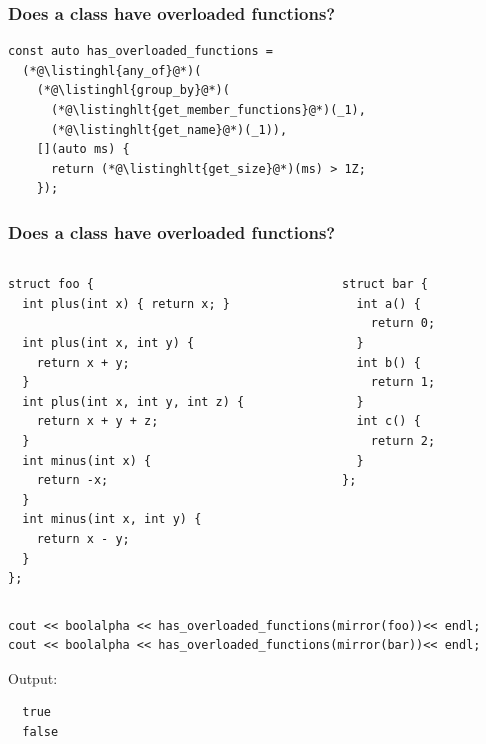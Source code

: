 \documentclass[aspectratio=169,compress,table,xcolor=table]{beamer}
\begin{document}
\begin{frame}[fragile]
  \frametitle{Does a class have overloaded functions?}
  \begin{lstlisting}[language=c++2x,basicstyle=\normalsize\ttfamily]
const auto has_overloaded_functions =
  (*@\listinghl{any_of}@*)(
    (*@\listinghl{group_by}@*)(
      (*@\listinghlt{get_member_functions}@*)(_1),
      (*@\listinghlt{get_name}@*)(_1)),
    [](auto ms) {
      return (*@\listinghlt{get_size}@*)(ms) > 1Z;
    });
  \end{lstlisting}
\end{frame}
\begin{frame}[fragile]
  \frametitle{Does a class have overloaded functions?}
  \begin{columns}
    \begin{column}{.50\textwidth}
      \begin{lstlisting}[language=c++2x,basicstyle=\tiny\ttfamily]
struct foo {
  int plus(int x) { return x; }

  int plus(int x, int y) {
    return x + y;
  }
  int plus(int x, int y, int z) {
    return x + y + z;
  }
  int minus(int x) {
    return -x;
  }
  int minus(int x, int y) {
    return x - y;
  }
};
      \end{lstlisting}
    \end{column}
    \begin{column}{.40\textwidth}
      \begin{lstlisting}[language=c++2x,basicstyle=\scriptsize\ttfamily]
struct bar {
  int a() {
    return 0;
  }
  int b() {
    return 1;
  }
  int c() {
    return 2;
  }
};
      \end{lstlisting}
    \end{column}
  \end{columns}
  \begin{lstlisting}[language=c++2x,basicstyle=\footnotesize\ttfamily]
cout << boolalpha << has_overloaded_functions(mirror(foo))<< endl;
cout << boolalpha << has_overloaded_functions(mirror(bar))<< endl;
  \end{lstlisting}
  Output:
  \smaller
  \begin{verbatim}
  true
  false
  \end{verbatim}
\end{frame}
\end{document}
